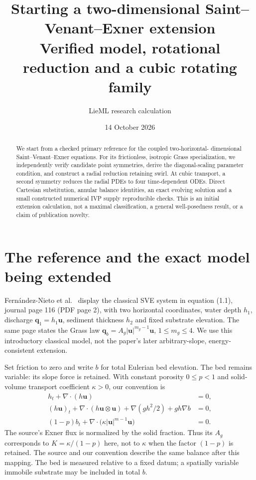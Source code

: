 \documentclass[11pt]{article}
\title{Starting a two-dimensional Saint--Venant--Exner extension\\
\large Verified model, rotational reduction and a cubic rotating family}
\author{LieML research calculation}
\date{14 October 2026}
\newcommand{\U}{\mathbf u}
\begin{document}
\maketitle
\begin{abstract}
We start from a checked primary reference for the coupled two-horizontal-
dimensional Saint--Venant--Exner equations. For its frictionless, isotropic
Grass specialization, we independently verify candidate point symmetries,
derive the diagonal-scaling parameter condition, and construct a radial
reduction retaining swirl. At cubic transport, a second symmetry reduces
the radial PDEs to four time-dependent ODEs. Direct Cartesian substitution,
annular balance identities, an exact evolving solution and a small constructed
numerical IVP supply reproducible checks. This is an initial extension
calculation, not a maximal classification, a general well-posedness result,
or a claim of publication novelty.
\end{abstract}

\section{The reference and the exact model being extended}
Fern\'andez-Nieto et al.~\cite{fernandez} display the classical SVE system
in equation (1.1), journal page 116 (PDF page 2), with two horizontal
coordinates, water depth $h_1$, discharge $\mathbf q_1=h_1\U$, sediment
thickness $h_2$ and fixed substrate elevation. The same page states the
Grass law $\mathbf q_b=A_g|\U|^{m_g-1}\U$, $1\leq m_g\leq4$.
We use this introductory classical model, not the paper's later
arbitrary-slope, energy-consistent extension.

Set friction to zero and write $b$ for total Eulerian bed elevation.
The bed remains variable: its slope force is retained. With constant
porosity $0\leq p<1$ and solid-volume transport coefficient $\kappa>0$,
our convention is
\begin{equation}\label{eq:conservative}
\begin{aligned}
 h_t+\nabla\!\cdot(h\U)&=0,\\
 (h\U)_t+\nabla\!\cdot(h\U\otimes\U)
       +\nabla(gh^2/2)+gh\nabla b&=0,\\
 (1-p)b_t+\nabla\!\cdot\bigl(\kappa|\U|^{m-1}\U\bigr)&=0.
\end{aligned}
\end{equation}
The source's Exner flux is normalized by the solid fraction. Thus its
$A_g$ corresponds to $K=\kappa/(1-p)$ here, not to $\kappa$ when the factor
$(1-p)$ is retained. The source and our convention describe the same
balance after this mapping. The bed is measured relative to a fixed datum;
a spatially variable immobile substrate may be included in total $b$.
\end{document}
